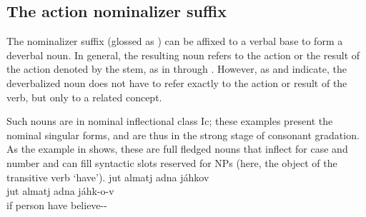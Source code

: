 \subsection{The action nominalizer suffix }\label{nmlz1}
The nominalizer suffix  (glossed as ) can be affixed to a verbal base to form a deverbal noun. %
In general, the resulting noun refers to the action or the result of the action denoted by the stem, as in  through . 
\ea\label{NMLZ1ex1}
\z
\ea\label{NMLZ1ex3b}
\z
\ea\label{NMLZ1ex4}
\z
\ea\label{NMLZ1ex5}
\z
\ea\label{NMLZ1ex6}
\z
\ea\label{NMLZ1ex7}
\z
However, as  and  indicate, the deverbalized noun does not have to refer exactly to the action or result of the verb, but only to a related concept. 
\ea\label{NMLZ1ex2}
\z
\ea\label{NMLZ1ex3a}
\z

Such nouns are in nominal inflectional class Ic; these examples present the nominal singular forms, and are thus in the strong stage of consonant gradation. 
As the example in  shows, these are full fledged nouns that inflect for case and number and can fill syntactic slots reserved for NPs (here, the object of the transitive verb  ‘have’).
\ea\label{nominalizerEx1}
\glll	jut almatj adna jáhkov\\
	jut almatj adna jáhk-o-v\\
	if person\BS{} have\BS{} believe--\\\nopagebreak
{}	
\z




